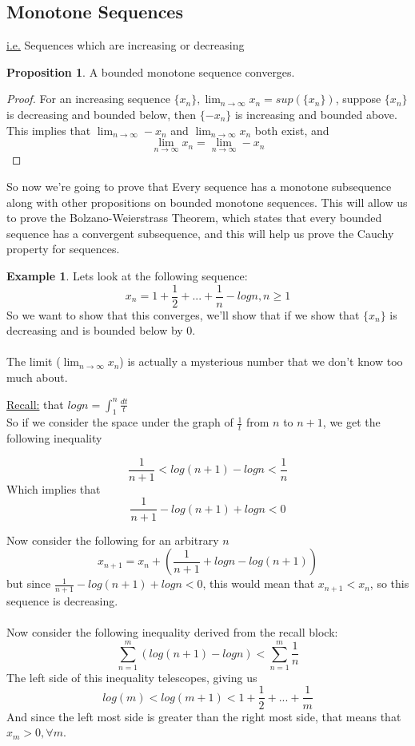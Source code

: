 \documentclass[12pt]{article}
\theoremstyle{plain}
\theoremstyle{definition}
\newtheorem{example}[theorem]{Example}
\newtheorem{proposition}[theorem]{Proposition}
\begin{document}
\subsection{Monotone Sequences}

\underline{i.e.} Sequences which are increasing or decreasing

\begin{proposition}
    A bounded monotone sequence converges.
\end{proposition}

\begin{proof}
    For an increasing sequence $\{ x_n \}, \lim_{n\to\infty} x_n = sup(\{ x_n \})$, suppose $\{ x_n \}$ is decreasing and bounded below, then $\{ -x_n \}$ is increasing and bounded above. This implies that $\lim_{n\to\infty} -x_n$ and $\lim_{n\to\infty} x_n$ both exist, and $$\lim_{n\to\infty} x_n = \lim_{n\to\infty} -x_n$$
\end{proof}

So now we're going to prove that Every sequence has a monotone subsequence along with other propositions on bounded monotone sequences. This will allow us to prove the Bolzano-Weierstrass Theorem, which states that every bounded sequence has a convergent subsequence, and this will help us prove the Cauchy property for sequences.

\begin{example}
    Lets look at the following sequence:
    $$x_n = 1 + \frac{1}{2} + ... + \frac{1}{n} - logn, n\geq 1$$
    So we want to show that this converges, we'll show that if we show that $\{ x_n \}$ is decreasing and is bounded below by 0.\\
    \\
    The limit ($\lim_{n\to\infty} x_n$) is actually a mysterious number that we don't know too much about.
    
    \begin{tcolorbox}
    \underline{Recall:} that $logn = \int^n_1 \frac{dt}{t}$\\
    So if we consider the space under the graph of $\frac{1}{t}$ from $n$ to $n+1$, we get the following inequality
    
    $$\frac{1}{n+1} < log(n+1) - logn < \frac{1}{n}$$
    Which implies that
    $$\frac{1}{n+1} - log(n+1) + logn < 0$$
    
    \end{tcolorbox}
    Now consider the following for an arbitrary $n$
    $$x_{n+1} = x_n + (\frac{1}{n+1} + logn - log(n+1))$$
    but since $\frac{1}{n+1} - log(n+1) + logn < 0$, this would mean that $x_{n+1} < x_n$, so this sequence is decreasing.\\
    \\
    Now consider the following inequality derived from the recall block:
    $$\sum^m_{n=1}(log(n+1) - logn) < \sum^m_{n=1}\frac{1}{n}$$
    The left side of this inequality telescopes, giving us
    $$log(m) < log(m+1) < 1 + \frac{1}{2} + ... + \frac{1}{m}$$
    And since the left most side is greater than the right most side, that means that $x_m > 0, \forall m$.
    
\end{example}
\end{document}
